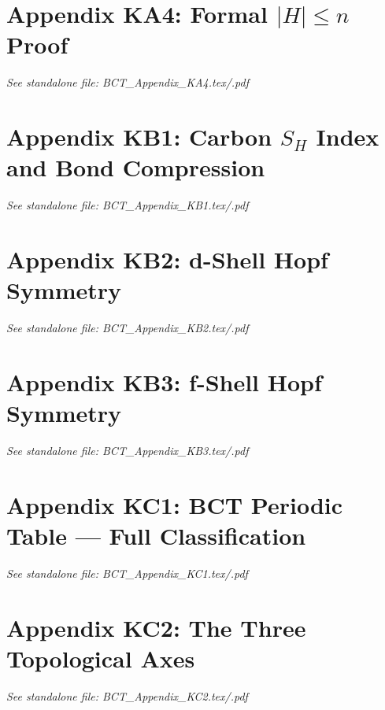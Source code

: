 \documentclass[aps,preprint,superscriptaddress,floatfix]{revtex4-2}
\begin{document}
\newpage
\section*{Appendix KA4: Formal $|H| \leq n$ Proof}
\textit{See standalone file: BCT\_Appendix\_KA4.tex/.pdf}

\newpage
\section*{Appendix KB1: Carbon $S_H$ Index and Bond Compression}
\textit{See standalone file: BCT\_Appendix\_KB1.tex/.pdf}

\newpage
\section*{Appendix KB2: d-Shell Hopf Symmetry}
\textit{See standalone file: BCT\_Appendix\_KB2.tex/.pdf}

\newpage
\section*{Appendix KB3: f-Shell Hopf Symmetry}
\textit{See standalone file: BCT\_Appendix\_KB3.tex/.pdf}

\newpage
\section*{Appendix KC1: BCT Periodic Table --- Full Classification}
\textit{See standalone file: BCT\_Appendix\_KC1.tex/.pdf}

\newpage
\section*{Appendix KC2: The Three Topological Axes}
\textit{See standalone file: BCT\_Appendix\_KC2.tex/.pdf}
\end{document}
